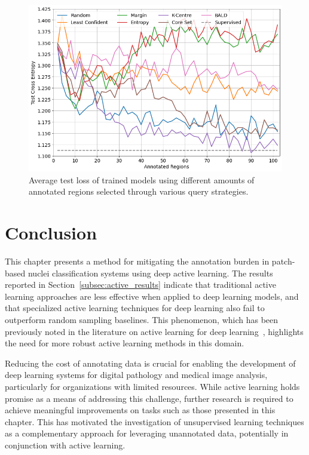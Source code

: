 \begin{figure}
	\centering
	\includegraphics[width=\textwidth]{images/active_learning_loss.png}
	\caption{Average test loss of trained models using different amounts of annotated regions selected through various query strategies.}
	\label{fig:active_learning_loss}
\end{figure}



\section{Conclusion}
\label{sec:active_conclusion}
This chapter presents a method for mitigating the annotation burden in patch-based nuclei classification systems using deep active learning. The results reported in Section~\ref{subsec:active_results} indicate that traditional active learning approaches are less effective when applied to deep learning models, and that specialized active learning techniques for deep learning also fail to outperform random sampling baselines. This phenomenon, which has been previously noted in the literature on active learning for deep learning~\citep{ren2021survey}, highlights the need for more robust active learning methods in this domain.

Reducing the cost of annotating data is crucial for enabling the development of deep learning systems for digital pathology and medical image analysis, particularly for organizations with limited resources. While active learning holds promise as a means of addressing this challenge, further research is required to achieve meaningful improvements on tasks such as those presented in this chapter. This has motivated the investigation of unsupervised learning techniques as a complementary approach for leveraging unannotated data, potentially in conjunction with active learning.